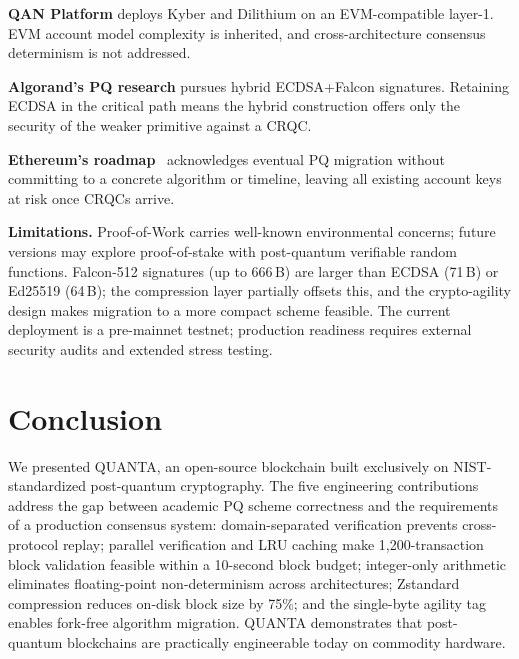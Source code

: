 \documentclass[11pt,a4paper]{article}
\begin{document}
\textbf{QAN Platform} deploys Kyber and Dilithium on an EVM-compatible
layer-1. EVM account model complexity is inherited, and cross-architecture
consensus determinism is not addressed.

\textbf{Algorand's PQ research} pursues hybrid ECDSA+Falcon signatures.
Retaining ECDSA in the critical path means the hybrid construction offers
only the security of the weaker primitive against a CRQC.

\textbf{Ethereum's roadmap}~\cite{buterin2023} acknowledges eventual PQ
migration without committing to a concrete algorithm or timeline, leaving
all existing account keys at risk once CRQCs arrive.

\textbf{Limitations.}
Proof-of-Work carries well-known environmental concerns; future versions
may explore proof-of-stake with post-quantum verifiable random functions.
Falcon-512 signatures (up to 666\,B) are larger than ECDSA (71\,B) or
Ed25519 (64\,B); the compression layer partially offsets this, and the
crypto-agility design makes migration to a more compact scheme feasible.
The current deployment is a pre-mainnet testnet; production readiness
requires external security audits and extended stress testing.

\section{Conclusion}

We presented QUANTA, an open-source blockchain built exclusively on
NIST-standardized post-quantum cryptography. The five engineering
contributions address the gap between academic PQ scheme correctness and
the requirements of a production consensus system: domain-separated
verification prevents cross-protocol replay; parallel verification and LRU
caching make 1,200-transaction block validation feasible within a 10-second
block budget; integer-only arithmetic eliminates floating-point
non-determinism across architectures; Zstandard compression reduces on-disk
block size by 75\%; and the single-byte agility tag enables fork-free
algorithm migration. QUANTA demonstrates that post-quantum blockchains are
practically engineerable today on commodity hardware.
\end{document}
